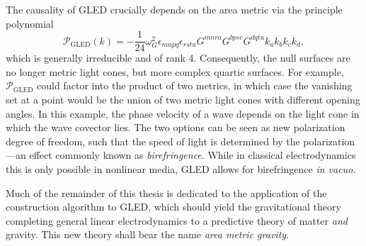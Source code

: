 The causality of GLED crucially depends on the area metric via the principle polynomial\cite{}
\begin{equation}
  \mathcal P_\text{GLED}(k) = -\frac{1}{24} \omega_G^2 \epsilon_{mnpq} \epsilon_{rstu} G^{mnra} G^{bpsc} G^{dqtu} k_a k_b k_c k_d,
\end{equation}
which is generally irreducible and of rank 4. Consequently, the null surfaces are no longer metric light cones, but more complex quartic surfaces. For example, $\mathcal P_\text{GLED}$ could factor into the product of two metrics, in which case the vanishing set at a point would be the union of two metric light cones with different opening angles. In this example, the phase velocity of a wave depends on the light cone in which the wave covector lies. The two options can be seen as new polarization degree of freedom, such that the speed of light is determined by the polarization---an effect commonly known as \emph{birefringence}. While in classical electrodynamics this is only possible in nonlinear media, GLED allows for birefringence \emph{in vacuo}.

Much of the remainder of this thesis is dedicated to the application of the construction algorithm to GLED, which should yield the gravitational theory completing general linear electrodynamics to a predictive theory of matter \emph{and} gravity. This new theory shall bear the name \emph{area metric gravity}.

